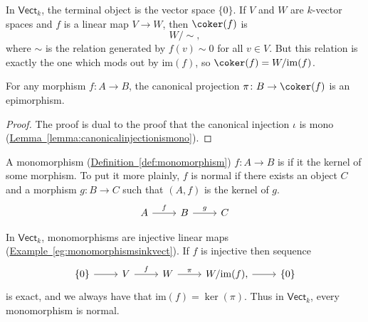 \documentclass[notes.tex]{subfiles}
\begin{document}
\begin{example}
  \label{eg:invectcokernelsarequotientsbyimage}
  In $\mathsf{Vect}_{k}$, the terminal object is the vector space $\{0\}$. If $V$ and $W$ are $k$-vector spaces and $f$ is a linear map $V \to W$, then $\coker(f)$ is
  \begin{equation*}
    W / \sim,
  \end{equation*}
  where $\sim$ is the relation generated by $f(v) \sim 0$ for all $v \in V$. But this relation is exactly the one which mods out by $\mathrm{im}(f)$, so $\coker(f) = W / \mathrm{im}(f)$.
\end{example}

\begin{lemma}
  \label{lemma:canonicalsurjectionisepi}
  For any morphism $f\colon A \to B$, the canonical projection $\pi\colon B \to \coker(f)$ is an epimorphism.
\end{lemma}
\begin{proof}
  The proof is dual to the proof that the canonical injection $\iota$ is mono (\hyperref[lemma:canonicalinjectionismono]{Lemma~\ref*{lemma:canonicalinjectionismono}}).
\end{proof}

\begin{definition}
  \label{def:normalmonomorphism}
  A monomorphism (\hyperref[def:monomorphism]{Definition~\ref*{def:monomorphism}}) $f\colon A \to B$ is  if it the kernel of some morphism. To put it more plainly, $f$ is normal if there exists an object $C$ and a morphism $g\colon B \to C$ such that $(A, f)$ is the kernel of $g$.
  \begin{equation*}
    \begin{tikzcd}
      A \arrow[r, "f"] & B \arrow[r, "g"] & C
    \end{tikzcd}
  \end{equation*}
\end{definition}

\begin{example}
  In $\mathsf{Vect}_{k}$, monomorphisms are injective linear maps (\hyperref[eg:monomorphismsinkvect]{Example~\ref*{eg:monomorphismsinkvect}}). If $f$ is injective then sequence
  \begin{equation*}
    \begin{tikzcd}
      \{0\} \arrow[r] & V \arrow[r, "f"] & W \arrow[r, "\pi"] & W/\mathrm{im}(f) \arrow[r], & \{0\}
    \end{tikzcd}
  \end{equation*}
  is exact, and we always have that $\mathrm{im}(f) = \ker(\pi)$. Thus in $\mathsf{Vect}_{k}$, every monomorphism is normal.
\end{example}
\end{document}
